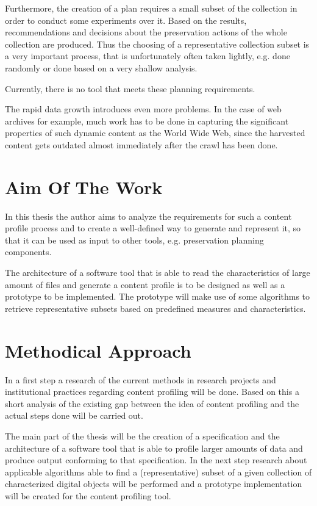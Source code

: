 Furthermore, the creation of a plan requires a small subset of the collection in order to conduct some experiments over it. Based on the results, recommendations and decisions about the preservation actions of the whole collection are produced. Thus the choosing of a representative collection subset is a very important process, that is unfortunately often taken lightly, e.g. done randomly or done based on a very shallow analysis.

Currently, there is no tool that meets these planning requirements.

The rapid data growth introduces even more problems. In the case of web archives for example, much work has to be done in capturing the significant properties of such dynamic content as the World Wide Web, since the harvested content gets outdated almost immediately after the crawl has been done.


\section{Aim Of The Work}
In this thesis the author aims to analyze the requirements for such a content profile process and to create a well-defined way to generate and represent it, so that it can be used as input to other tools, e.g. preservation planning components.

The architecture of a software tool that is able to read the characteristics of large amount of files and generate a content profile is to be designed as well as a prototype to be implemented. The prototype will make use of some algorithms to retrieve representative subsets based on predefined measures and characteristics.

\section{Methodical Approach}
In a first step a research of the current methods in research projects and institutional practices regarding content profiling will be done. Based on this a short analysis of the existing gap between the idea of content profiling and the actual steps done will be carried out. 

The main part of the thesis will be the creation of a specification and the architecture of a software tool that is able to profile larger amounts of data and produce output conforming to that specification. In the next step research about applicable algorithms able to find a (representative) subset of a given collection of characterized digital objects will be performed and a prototype implementation will be created for the content profiling tool. 

